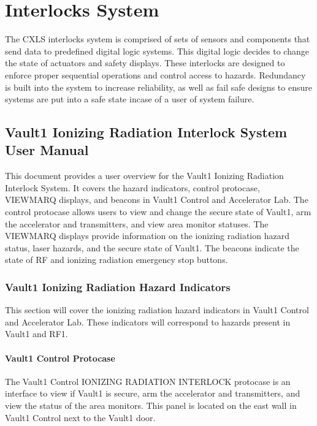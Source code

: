 \documentclass[letterpaper,10pt,english]{sphinxmanual}
\begin{document}
\chapter{Interlocks System}
\label{\detokenize{index:interlocks-system}}
\sphinxAtStartPar
The CXLS interlocks system is comprised of sets of sensors and components that send data to predefined digital logic systems.
This digital logic decides to change the state of actuators and safety displays.
These interlocks are designed to enforce proper sequential operations and control access to hazards.
Redundancy is built into the system to increase reliability, as well as fail safe designs to ensure systems are put into a safe state incase of a user of system failure.

\sphinxstepscope


\section{Vault\sphinxhyphen{}1 Ionizing Radiation Interlock System User Manual}
\label{\detokenize{user_documentation/Vault-1_ionizing_radiation:vault-1-ionizing-radiation-interlock-system-user-manual}}\label{\detokenize{user_documentation/Vault-1_ionizing_radiation::doc}}
\sphinxAtStartPar
This document provides a user overview for the Vault\sphinxhyphen{}1 Ionizing Radiation Interlock System.
It covers the hazard indicators, control protocase, VIEWMARQ displays, and beacons in Vault\sphinxhyphen{}1 Control and Accelerator Lab.
The control protocase allows users to view and change the secure state of Vault\sphinxhyphen{}1, arm the accelerator and transmitters, and view area monitor statuses.
The VIEWMARQ displays provide information on the ionizing radiation hazard status, laser hazards, and the secure state of Vault\sphinxhyphen{}1.
The beacons indicate the state of RF and ionizing radiation emergency stop buttons.


\subsection{Vault\sphinxhyphen{}1 Ionizing Radiation Hazard Indicators}
\label{\detokenize{user_documentation/Vault-1_ionizing_radiation:vault-1-ionizing-radiation-hazard-indicators}}
\sphinxAtStartPar
This section will cover the ionizing radiation hazard indicators in Vault\sphinxhyphen{}1 Control and Accelerator Lab.
These indicators will correspond to hazards present in Vault\sphinxhyphen{}1 and RF\sphinxhyphen{}1.


\subsubsection{Vault\sphinxhyphen{}1 Control Protocase}
\label{\detokenize{user_documentation/Vault-1_ionizing_radiation:vault-1-control-protocase}}
\sphinxAtStartPar
The Vault\sphinxhyphen{}1 Control IONIZING RADIATION INTERLOCK protocase is an interface to view if Vault\sphinxhyphen{}1 is secure, arm the accelerator and transmitters, and view the status of the area monitors.
This panel is located on the east wall in Vault\sphinxhyphen{}1 Control next to the Vault\sphinxhyphen{}1 door.
\end{document}
